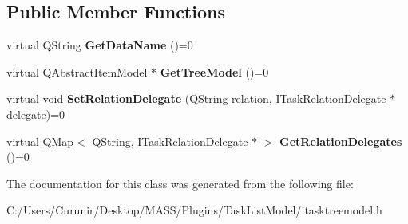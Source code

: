 \subsection*{Public Member Functions}
\begin{DoxyCompactItemize}
\item 
\mbox{\label{class_i_task_tree_model_acb54f948f72d43f4ef600d80e16eb123}} 
virtual Q\+String {\bfseries Get\+Data\+Name} ()=0
\item 
\mbox{\label{class_i_task_tree_model_adbffd903706e118845cbeced9f47b914}} 
virtual Q\+Abstract\+Item\+Model $\ast$ {\bfseries Get\+Tree\+Model} ()=0
\item 
\mbox{\label{class_i_task_tree_model_a027018d851799a47dd48b17b6d23d8fd}} 
virtual void {\bfseries Set\+Relation\+Delegate} (Q\+String relation, \hyperlink{class_i_task_tree_model_1_1_i_task_relation_delegate}{I\+Task\+Relation\+Delegate} $\ast$delegate)=0
\item 
\mbox{\label{class_i_task_tree_model_aea39be804200f98c945e82cdb8476d79}} 
virtual \hyperlink{class_q_map}{Q\+Map}$<$ Q\+String, \hyperlink{class_i_task_tree_model_1_1_i_task_relation_delegate}{I\+Task\+Relation\+Delegate} $\ast$ $>$ {\bfseries Get\+Relation\+Delegates} ()=0
\end{DoxyCompactItemize}


The documentation for this class was generated from the following file\+:\begin{DoxyCompactItemize}
\item 
C\+:/\+Users/\+Curunir/\+Desktop/\+M\+A\+S\+S/\+Plugins/\+Task\+List\+Model/itasktreemodel.\+h\end{DoxyCompactItemize}
